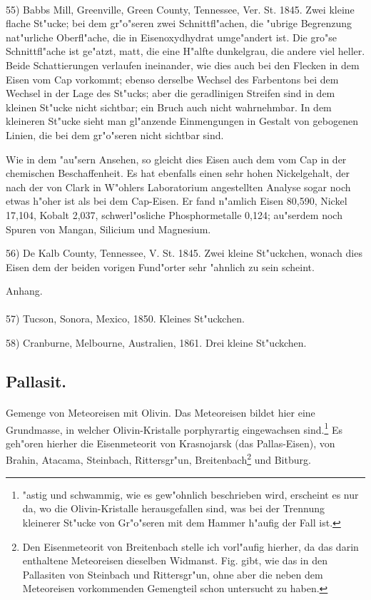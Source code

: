 \documentclass[a4paper, 11pt, oneside, german]{article}
\begin{document}
\paragraph{}
55) Babbs Mill, Greenville, Green County, Tennessee, Ver. St. 1845. Zwei kleine flache St"ucke; bei dem gr"o"seren zwei Schnittfl"achen, die "ubrige Begrenzung nat"urliche Oberfl"ache, die in Eisenoxydhydrat umge"andert ist. Die gro"se Schnittfl"ache ist ge"atzt, matt, die eine H"alfte dunkelgrau, die andere viel heller. Beide Schattierungen verlaufen ineinander, wie dies auch bei den Flecken in dem Eisen vom Cap vorkommt; ebenso derselbe Wechsel des Farbentons bei dem Wechsel in der Lage des St"ucks; aber die geradlinigen Streifen sind in dem kleinen St"ucke nicht sichtbar; ein Bruch auch nicht wahrnehmbar. In dem kleineren St"ucke sieht man gl"anzende Einmengungen in Gestalt von gebogenen Linien, die bei dem gr"o"seren nicht sichtbar sind.

Wie in dem "au"sern Ansehen, so gleicht dies Eisen auch dem vom Cap in der chemischen Beschaffenheit. Es hat ebenfalls einen sehr hohen Nickelgehalt, der nach der von Clark in W"ohlers Laboratorium angestellten Analyse sogar noch etwas h"oher ist als bei dem Cap-Eisen. Er fand n"amlich Eisen 80,590, Nickel 17,104, Kobalt 2,037, schwerl"osliche Phosphormetalle 0,124; au"serdem noch Spuren von Mangan, Silicium und Magnesium.

56) De Kalb County, Tennessee, V. St. 1845. Zwei kleine St"uckchen, wonach dies Eisen dem der beiden vorigen Fund"orter sehr "ahnlich zu sein scheint.
\begin{center}
Anhang. 
\end{center}
\paragraph{}
57) Tucson, Sonora, Mexico, 1850. Kleines St"uckchen.

58) Cranburne, Melbourne, Australien, 1861. Drei kleine St"uckchen.
\subsection{Pallasit.}
\paragraph{}
Gemenge von Meteoreisen mit Olivin. Das Meteoreisen bildet hier eine Grundmasse, in welcher Olivin-Kristalle porphyrartig eingewachsen sind.\footnote{"astig und schwammig, wie es gew"ohnlich beschrieben wird, erscheint es nur da, wo die Olivin-Kristalle herausgefallen sind, was bei der Trennung kleinerer St"ucke von Gr"o"seren mit dem Hammer h"aufig der Fall ist.} Es geh"oren hierher die Eisenmeteorit von Krasnojarsk (das Pallas-Eisen), von Brahin, Atacama, Steinbach, Rittersgr"un, Breitenbach\footnote{Den Eisenmeteorit von Breitenbach stelle ich vorl"aufig hierher, da das darin enthaltene Meteoreisen dieselben Widmanst. Fig. gibt, wie das in den Pallasiten von Steinbach und Rittersgr"un, ohne aber die neben dem Meteoreisen vorkommenden Gemengteil schon untersucht zu haben.} und Bitburg.
\end{document}
